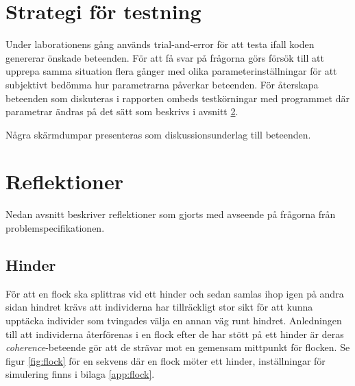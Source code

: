 \documentclass[titlepage, a4paper, 12pt]{article}
\begin{document}
\section{Strategi för testning}
Under laborationens gång används trial-and-error för att testa ifall
koden genererar önskade beteenden. För att få svar på frågorna görs
försök till att upprepa samma situation flera gånger med olika
parameterinställningar för att subjektivt bedömma hur parametrarna
påverkar beteenden. För återskapa beteenden som diskuteras i rapporten
ombeds testkörningar med programmet där parametrar ändras på det sätt
som beskrivs i avsnitt \ref{sec:reflektioner}.

Några skärmdumpar presenteras som diskussionsunderlag till beteenden.

\section{Reflektioner}\label{sec:reflektioner}


Nedan avsnitt beskriver reflektioner som gjorts med avseende på
frågorna från problemspecifikationen.

\subsection{Hinder}
För att en flock ska splittras vid ett hinder och sedan samlas ihop
igen på andra sidan hindret krävs att individerna har tillräckligt
stor sikt för att kunna upptäcka individer som tvingades välja en
annan väg runt hindret. Anledningen till att individerna återförenas i
en flock efter de har stött på ett hinder är deras
\textit{coherence}-beteende gör att de strävar mot en gemensam
mittpunkt för flocken. Se figur \ref{fig:flock} för en sekvens där en
flock möter ett hinder, inställningar för simulering finns i bilaga
\ref{app:flock}.
\end{document}
